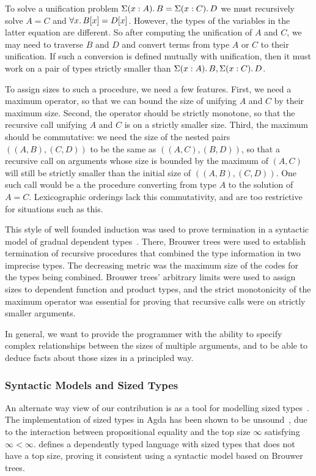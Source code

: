 To solve a unification problem $ \Sigma(x : A)\ldotp B = \Sigma(x : C)\ldotp D$
we must recursively
solve $A = C$ and $\forall x \ldotp B[x] = D[x]$.
However, the types of the variables in the latter equation are different.
So after computing the unification of $A$ and $C$, we may need to traverse
$B$ and $D$ and convert terms from type $A$ or $C$ to their unification.
If such a conversion is defined mutually with unification, then
it must work on a pair of types strictly smaller than
$\Sigma(x : A)\ldotp B , \Sigma(x : C)\ldotp D$.

To assign sizes to such a procedure, we need a few features.
First, we need
a maximum operator, so that we can bound the size of unifying $A$ and $C$
by their maximum size.
Second, the operator should be strictly monotone, so that the recursive
call unifying $A$ and $C$ is on a strictly smaller size.
Third, the maximum should be commutative:
we need the size of the nested pairs $((A,B),(C,D))$
to be the same as $((A,C),(B,D))$, so that a recursive call on arguments whose
size is bounded by the maximum of  $(A,C)$ will still
be strictly smaller than the initial size of $((A,B),(C,D))$.
One such call would be a the procedure converting from type $A$ to the
solution of $A=C$.
Lexicographic orderings lack this commutativity, and are too restrictive
for situations such as this.

This style of well founded induction was used to prove termination
in a syntactic model of gradual dependent types~\citep{Eremondi_2023}. There, Brouwer trees
were used to establish termination of recursive procedures that
combined the type information in two imprecise types.
The decreasing metric was the maximum size of the codes for the types being combined. Brouwer trees' arbitrary limits were used to assign sizes
to dependent function and product types, and the strict monotonicity of the
maximum operator was essential for proving that recursive calls were on
strictly smaller arguments.

In general, we want to provide the programmer with the ability
to specify complex relationships between the sizes of multiple arguments,
and to be able to deduce facts about those sizes in a principled way.

\subsubsection{Syntactic Models and Sized Types}

An alternate way view of our contribution is as a tool for modelling sized types~\citep{10.1145/237721.240882}.
The implementation of sized types in Agda has been shown to be unsound~\citep{agdaSizedIssue}, due to the interaction
between propositional equality and the top size $\infty$ satisfying $\infty < \infty$.
 defines a dependently typed language with sized types that does not have a top size, proving it consistent
using a syntactic model based on Brouwer trees.

